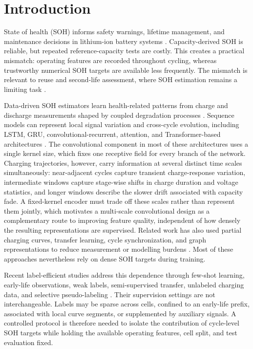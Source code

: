 \documentclass[pdflatex,sn-mathphys-num]{sn-jnl}
\begin{document}
\maketitle

\section{Introduction}

State of health (SOH) informs safety warnings, lifetime management, and maintenance decisions in lithium-ion battery systems \cite{berecibar2016critical}. Capacity-derived SOH is reliable, but repeated reference-capacity tests are costly. This creates a practical mismatch: operating features are recorded throughout cycling, whereas trustworthy numerical SOH targets are available less frequently. The mismatch is relevant to reuse and second-life assessment, where SOH estimation remains a limiting task \cite{vignesh2024state}.

Data-driven SOH estimators learn health-related patterns from charge and discharge measurements shaped by coupled degradation processes \cite{che2023health,birkl2017degradation}. Sequence models can represent local signal variation and cross-cycle evolution, including LSTM, GRU, convolutional-recurrent, attention, and Transformer-based architectures \cite{hochreiter1997long,liu2023online,zhu2022attention,fan2023online,chen2022state,zhao2023state}. The convolutional component in most of these architectures uses a single kernel size, which fixes one receptive field for every branch of the network. Charging trajectories, however, carry information at several distinct time scales simultaneously: near-adjacent cycles capture transient charge-response variation, intermediate windows capture stage-wise shifts in charge duration and voltage statistics, and longer windows describe the slower drift associated with capacity fade. A fixed-kernel encoder must trade off these scales rather than represent them jointly, which motivates a multi-scale convolutional design as a complementary route to improving feature quality, independent of how densely the resulting representations are supervised. Related work has also used partial charging curves, transfer learning, cycle synchronization, and graph representations to reduce measurement or modelling burdens \cite{lyu2021partial,lu2023deep,ma2022real,zhou2022transfer,zhou2024graph}. Most of these approaches nevertheless rely on dense SOH targets during training.

Recent label-efficient studies address this dependence through few-shot learning, early-life observations, weak labels, semi-supervised transfer, unlabeled charging data, and selective pseudo-labeling \cite{zhang2023fewshot,han2024limited,wang2024weaklabels,qian2026minimal,li2020state,lin2023improving,salucci2023novel,li2026auxiliary}. Their supervision settings are not interchangeable. Labels may be sparse across cells, confined to an early-life prefix, associated with local curve segments, or supplemented by auxiliary signals. A controlled protocol is therefore needed to isolate the contribution of cycle-level SOH targets while holding the available operating features, cell split, and test evaluation fixed.
\end{document}

